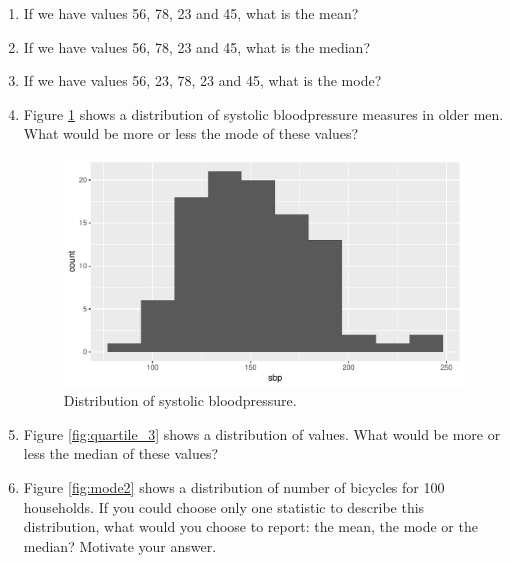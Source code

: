 \documentclass[]{report}\usepackage[]{graphicx}\usepackage[]{color}
\makeatletter
\def\maxwidth{ %
  \ifdim\Gin@nat@width>\linewidth
    \linewidth
  \else
    \Gin@nat@width
  \fi
}
\makeatother
\begin{document}
\begin{enumerate}

\item If we have values 56, 78, 23 and 45, what is the mean?

\item If we have values 56, 78, 23 and 45, what is the median?

\item If we have values 56, 23, 78, 23 and 45, what is the mode?

\item Figure \ref{fig:mode} shows a distribution of systolic bloodpressure measures in older men. What would be more or less the mode of these values?

\begin{figure}

{\centering \includegraphics[width=\maxwidth]{figure/mode-1} 

}

\caption[Distribution of systolic bloodpressure]{Distribution of systolic bloodpressure.}\label{fig:mode}
\end{figure}



\item Figure \ref{fig:quartile_3} shows a distribution of values. What would be more or less the median of these values?

\item Figure \ref{fig:mode2} shows a distribution of number of bicycles for 100 households. If you could choose only one statistic to describe this distribution, what would you choose to report: the mean, the mode or the median? Motivate your answer.

\begin{figure}


\end{figure}
\end{enumerate}
\end{document}
